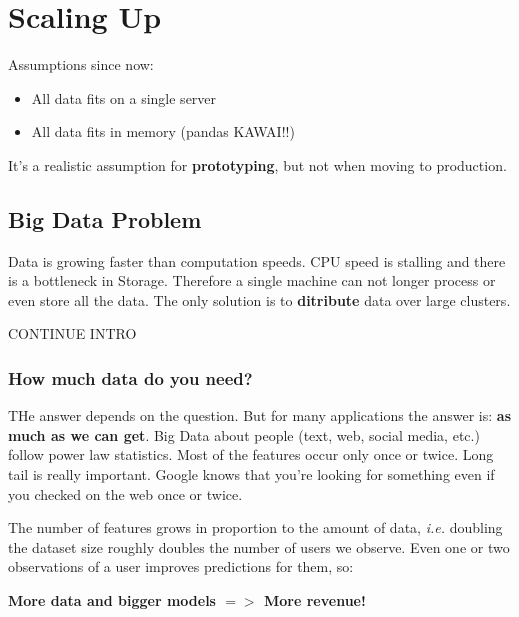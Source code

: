 \section{Scaling Up}

Assumptions since now:
\begin{itemize}
 \item All data fits on a single server
 \item All data fits in memory (pandas KAWAI!!)
\end{itemize}
It's a realistic assumption for {\bf prototyping}, but not when moving to production.

\subsection{Big Data Problem}
Data is growing faster than computation speeds. CPU speed is stalling and there is a bottleneck in Storage. Therefore a single machine can not longer process or even store all the data. The only solution is to {\bf ditribute} data over large clusters.

CONTINUE INTRO

\subsubsection{How much data do you need?}
THe answer depends on the question. But for many applications the answer is: {\bf as much as we can get}. Big Data about people (text, web, social media, etc.) follow power law statistics. Most of the features occur only once or twice. Long tail is really important. Google knows that you're looking for something even if you checked on the web once or twice. 

The number of features grows in proportion to the amount of data, {\it i.e.} doubling the dataset size roughly doubles the number of users we observe. Even one or two observations of a user improves predictions for them, so:
\begin{center}
 {\bf More data and bigger models $=>$ More revenue!}
\end{center}

